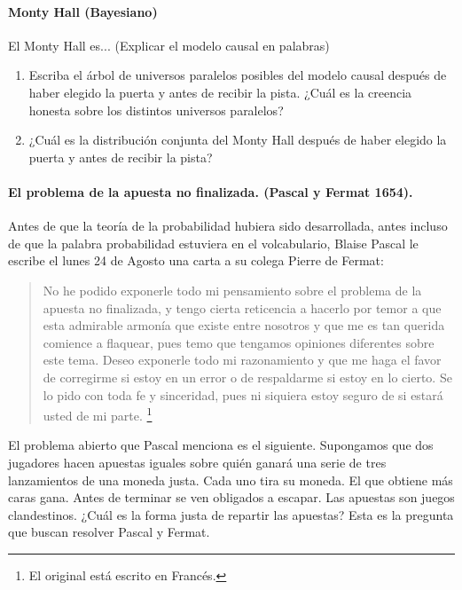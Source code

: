 \documentclass[a4paper,10pt]{article}
\begin{document}
\paragraph{Monty Hall (Bayesiano)} El Monty Hall es... (Explicar el modelo causal en palabras)

\begin{enumerate}[resume]
\item Escriba el árbol de universos paralelos posibles del modelo causal después de haber elegido la puerta y antes de recibir la pista. ¿Cuál es la creencia honesta sobre los distintos universos paralelos?
\item ¿Cuál es la distribución conjunta del Monty Hall después de haber elegido la puerta y antes de recibir la pista?
\end{enumerate}

\paragraph{El problema de la apuesta no finalizada. (Pascal y Fermat 1654).}

Antes de que la teoría de la probabilidad hubiera sido desarrollada, antes incluso de que la palabra probabilidad estuviera en el volcabulario, Blaise Pascal le escribe el lunes 24 de Agosto una carta a su colega Pierre de Fermat:

\begin{quotation}
No he podido exponerle todo mi pensamiento sobre el problema de la apuesta no finalizada, y tengo cierta reticencia a hacerlo por temor a que esta admirable armonía que existe entre nosotros y que me es tan querida comience a flaquear, pues temo que tengamos opiniones diferentes sobre este tema.
Deseo exponerle todo mi razonamiento y que me haga el favor de corregirme si estoy en un error o de respaldarme si estoy en lo cierto.
Se lo pido con toda fe y sinceridad, pues ni siquiera estoy seguro de si estará usted de mi parte.
\footnote{El original está escrito en Francés.}
\end{quotation}

El problema abierto que Pascal menciona es el siguiente. 
Supongamos que dos jugadores hacen apuestas iguales sobre quién ganará una serie de tres lanzamientos de una moneda justa.
Cada uno tira su moneda.
El que obtiene más caras gana.
Antes de terminar se ven obligados a escapar. 
Las apuestas son juegos clandestinos.
¿Cuál es la forma justa de repartir las apuestas?
Esta es la pregunta que buscan resolver Pascal y Fermat.
\end{document}

